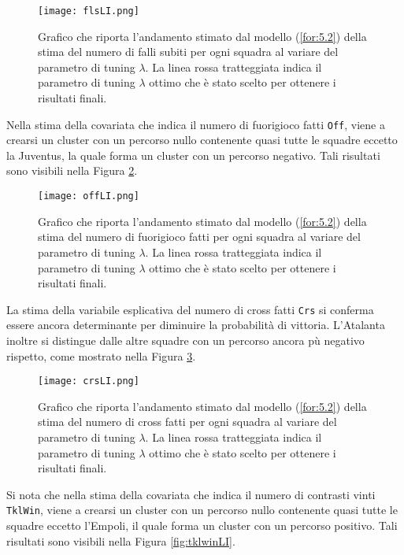 \begin{figure}[htbp]
	\begin{center}
		\texttt{[image: flsLI.png]}
		\caption{Grafico che riporta l'andamento stimato dal modello (\ref{for:5.2}) della stima del numero di falli subiti per ogni squadra al variare del parametro di tuning $\lambda$. La linea rossa tratteggiata indica il parametro di tuning $\lambda$ ottimo che è stato scelto per ottenere i risultati finali.} \label{fig:flsLI}
	\end{center}
\end{figure}
Nella stima della covariata che indica il numero di fuorigioco fatti \texttt{Off}, viene a crearsi un cluster con un percorso nullo contenente quasi tutte le squadre eccetto la Juventus, la quale forma un cluster con un percorso negativo. Tali risultati sono visibili nella Figura \ref{fig:offLI}.
\begin{figure}[htbp]
	\begin{center}
		\texttt{[image: offLI.png]}
		\caption{Grafico che riporta l'andamento stimato dal modello (\ref{for:5.2}) della stima del numero di fuorigioco fatti per ogni squadra al variare del parametro di tuning $\lambda$. La linea rossa tratteggiata indica il parametro di tuning $\lambda$ ottimo che è stato scelto per ottenere i risultati finali.} \label{fig:offLI}
	\end{center}
\end{figure}
La stima della variabile esplicativa del numero di cross fatti \texttt{Crs} si conferma essere ancora determinante per diminuire la probabilità di vittoria. L'Atalanta inoltre si distingue dalle altre squadre con un percorso ancora pù negativo rispetto, come mostrato nella Figura \ref{fig:crsLI}.
\begin{figure}[htbp]
	\begin{center}
		\texttt{[image: crsLI.png]}
		\caption{Grafico che riporta l'andamento stimato dal modello (\ref{for:5.2}) della stima del numero di cross fatti per ogni squadra al variare del parametro di tuning $\lambda$. La linea rossa tratteggiata indica il parametro di tuning $\lambda$ ottimo che è stato scelto per ottenere i risultati finali.} \label{fig:crsLI}
	\end{center}
\end{figure}
Si nota che nella stima della covariata che indica il numero di contrasti vinti \texttt{TklWin}, viene a crearsi un cluster con un percorso nullo contenente quasi tutte le squadre eccetto l'Empoli, il quale forma un cluster con un percorso positivo. Tali risultati sono visibili nella Figura \ref{fig:tklwinLI}.
